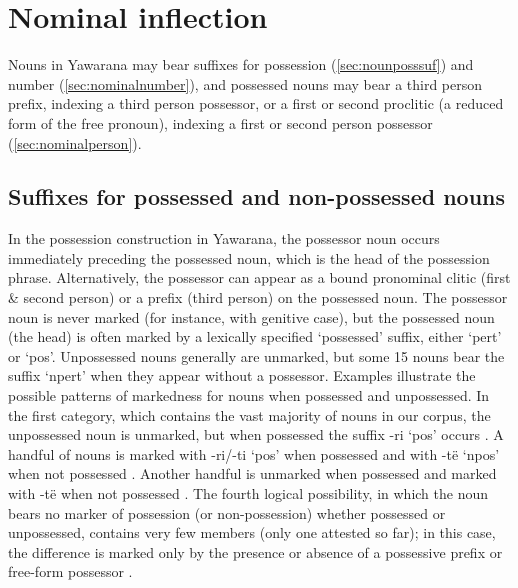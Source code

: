 \documentclass{memoir}
\begin{document}
\section{\texorpdfstring{Nominal inflection
\label{sec:nouninfl}}{Nominal inflection }}

Nouns in Yawarana may bear suffixes for possession
(\cref{sec:nounposssuf}) and number (\cref{sec:nominalnumber}), and
possessed nouns may bear a third person prefix, indexing a third person
possessor, or a first or second proclitic (a reduced form of the free
pronoun), indexing a first or second person possessor
(\cref{sec:nominalperson}).

\subsection{\texorpdfstring{Suffixes for possessed and non-possessed
nouns
\label{sec:nounposssuf}}{Suffixes for possessed and non-possessed nouns }}

In the possession construction in Yawarana, the possessor noun occurs
immediately preceding the possessed noun, which is the head of the
possession phrase. Alternatively, the possessor can appear as a bound
pronominal clitic (first \& second person) or a prefix (third person) on
the possessed noun. The possessor noun is never marked (for instance,
with genitive case), but the possessed noun (the head) is often marked
by a lexically specified `possessed' suffix, either  `pert' or
 `pos'. Unpossessed nouns generally are unmarked, but some 15
nouns bear the suffix  `npert' when they appear without a
possessor. Examples  illustrate
the possible patterns of markedness for nouns when possessed and
unpossessed. In the first category, which contains the vast majority of
nouns in our corpus, the unpossessed noun is unmarked, but when
possessed the suffix -ri `pos' occurs . A handful
of nouns is marked with -ri/-ti `pos' when possessed and with -të `npos'
when not possessed . Another handful is unmarked
when possessed and marked with -të when not possessed
. The fourth logical possibility, in which the
noun bears no marker of possession (or non-possession) whether possessed
or unpossessed, contains very few members (only one attested so far); in
this case, the difference is marked only by the presence or absence of a
possessive prefix or free-form possessor .
\end{document}
